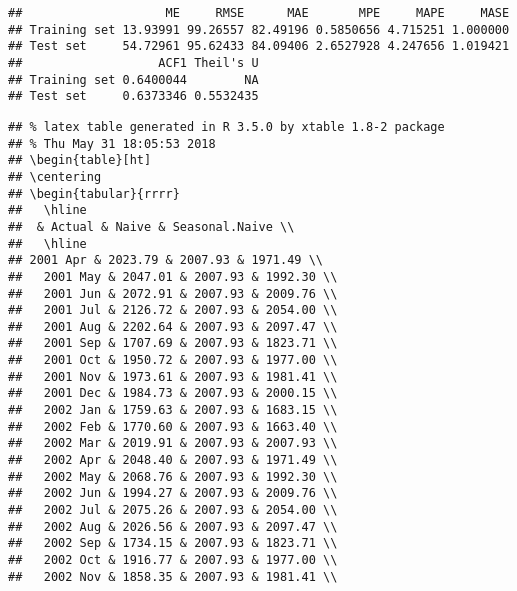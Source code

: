 \documentclass[]{article}
\begin{document}
\begin{verbatim}
##                    ME     RMSE      MAE       MPE     MAPE     MASE
## Training set 13.93991 99.26557 82.49196 0.5850656 4.715251 1.000000
## Test set     54.72961 95.62433 84.09406 2.6527928 4.247656 1.019421
##                   ACF1 Theil's U
## Training set 0.6400044        NA
## Test set     0.6373346 0.5532435
\end{verbatim}

\begin{verbatim}
## % latex table generated in R 3.5.0 by xtable 1.8-2 package
## % Thu May 31 18:05:53 2018
## \begin{table}[ht]
## \centering
## \begin{tabular}{rrrr}
##   \hline
##  & Actual & Naive & Seasonal.Naive \\ 
##   \hline
## 2001 Apr & 2023.79 & 2007.93 & 1971.49 \\ 
##   2001 May & 2047.01 & 2007.93 & 1992.30 \\ 
##   2001 Jun & 2072.91 & 2007.93 & 2009.76 \\ 
##   2001 Jul & 2126.72 & 2007.93 & 2054.00 \\ 
##   2001 Aug & 2202.64 & 2007.93 & 2097.47 \\ 
##   2001 Sep & 1707.69 & 2007.93 & 1823.71 \\ 
##   2001 Oct & 1950.72 & 2007.93 & 1977.00 \\ 
##   2001 Nov & 1973.61 & 2007.93 & 1981.41 \\ 
##   2001 Dec & 1984.73 & 2007.93 & 2000.15 \\ 
##   2002 Jan & 1759.63 & 2007.93 & 1683.15 \\ 
##   2002 Feb & 1770.60 & 2007.93 & 1663.40 \\ 
##   2002 Mar & 2019.91 & 2007.93 & 2007.93 \\ 
##   2002 Apr & 2048.40 & 2007.93 & 1971.49 \\ 
##   2002 May & 2068.76 & 2007.93 & 1992.30 \\ 
##   2002 Jun & 1994.27 & 2007.93 & 2009.76 \\ 
##   2002 Jul & 2075.26 & 2007.93 & 2054.00 \\ 
##   2002 Aug & 2026.56 & 2007.93 & 2097.47 \\ 
##   2002 Sep & 1734.15 & 2007.93 & 1823.71 \\ 
##   2002 Oct & 1916.77 & 2007.93 & 1977.00 \\ 
##   2002 Nov & 1858.35 & 2007.93 & 1981.41 \\ 

\end{verbatim}
\end{document}
